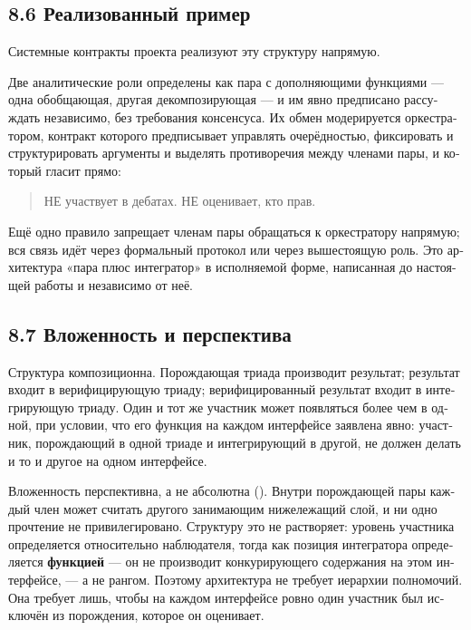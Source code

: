 \begin{russian}
\subsection*{8.6 Реализованный пример}
\label{sec:ru:8.6}

Системные контракты проекта реализуют эту структуру напрямую.

Две аналитические роли определены как пара с дополняющими функциями — одна обобщающая, другая декомпозирующая — и им явно предписано рассуждать независимо, без требования консенсуса. Их обмен модерируется оркестратором, контракт которого предписывает управлять очерёдностью, фиксировать и структурировать аргументы и выделять противоречия между членами пары, и который гласит прямо:

\begin{quote}
НЕ участвует в дебатах. НЕ оценивает, кто прав.
\end{quote}
Ещё одно правило запрещает членам пары обращаться к оркестратору напрямую; вся связь идёт через формальный протокол или через вышестоящую роль. Это архитектура «пара плюс интегратор» в исполняемой форме, написанная до настоящей работы и независимо от неё.


\subsection*{8.7 Вложенность и перспектива}
\label{sec:ru:8.7}

Структура композиционна. Порождающая триада производит результат; результат входит в верифицирующую триаду; верифицированный результат входит в интегрирующую триаду. Один и тот же участник может появляться более чем в одной, при условии, что его функция на каждом интерфейсе заявлена явно: участник, порождающий в одной триаде и интегрирующий в другой, не должен делать и то и другое на одном интерфейсе.

Вложенность перспективна, а не абсолютна (). Внутри порождающей пары каждый член может считать другого занимающим нижележащий слой, и ни одно прочтение не привилегировано. Структуру это не растворяет: уровень участника определяется относительно наблюдателя, тогда как позиция интегратора определяется \textbf{функцией} — он не производит конкурирующего содержания на этом интерфейсе, — а не рангом. Поэтому архитектура не требует иерархии полномочий. Она требует лишь, чтобы на каждом интерфейсе ровно один участник был исключён из порождения, которое он оценивает.


\end{russian}

